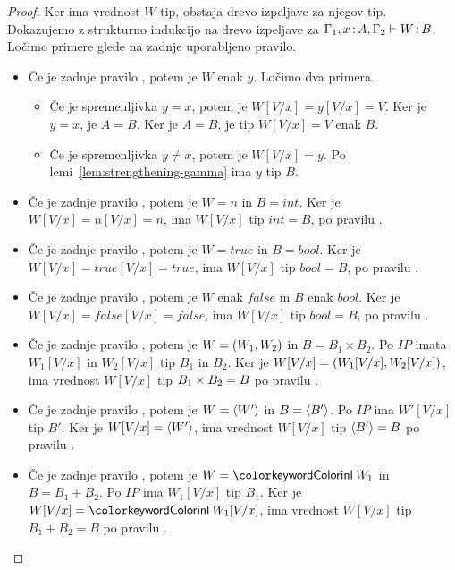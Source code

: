 \begin{proof}
	Ker ima vrednost $W$ tip, obstaja drevo izpeljave za njegov tip.
	Dokazujemo z strukturno indukcijo na drevo izpeljave za $\Gamma_1, x \mathinner{:} A, \Gamma_2 \vdash W \mathinner{:} B$.
	Ločimo primere glede na zadnje uporabljeno pravilo.
	
	\begin{itemize}
		\item Če je zadnje pravilo , potem je $W$ enak $y$. Ločimo dva primera.
		\begin{itemize}
			\item Če je spremenljivka $y = x$, potem je $W[V/x] = y[V/x] = V$. Ker je $y = x$, je $A = B$. Ker je $A = B$, je tip $W[V/x] = V$ enak $B$.
			\item Če je spremenljivka $y \neq x$, potem je $W[V/x] = y$. Po lemi~\ref{lem:strengthening-gamma} ima $y$ tip $B$.
		\end{itemize}
	
		\item Če je zadnje pravilo , potem je $W=n$ in $B=int$. Ker je $W[V/x] = n[V/x] = n$, ima $W[V/x]$ tip $int = B$, po pravilu .
		\item Če je zadnje pravilo , potem je $W=true$ in $B=bool$. Ker je $W[V/x] = true[V/x] = true$, ima $W[V/x]$ tip $bool = B$, po pravilu . 
		\item Če je zadnje pravilo , potem je $W$ enak $false$ in $B$ enak $bool$. Ker je $W[V/x] = false[V/x] = false$, ima $W[V/x]$ tip $bool = B$, po pravilu .
		
		\item Če je zadnje pravilo , potem je $W =( W_1 , W_2 )$ in $B = B_1 \times B_2$. Po $IP$ imata $W_1[V/x]$ in $W_2[V/x]$ tip $B_1$ in $B_2$.
		Ker je $W[V/x] = ( W_1[V/x] , W_2[V/x] )$, ima vrednost $W[V/x]$ tip $B_1 \times B_2 = B$ po pravilu .
		
		\item Če je zadnje pravilo , potem je $W = \langle W' \rangle$ in $B = \langle B' \rangle$. Po $IP$ ima $W'[V/x]$ tip $B'$.
		Ker je $W[V/x] = \langle W' \rangle$, ima vrednost $W[V/x]$ tip $\langle B' \rangle = B$ po pravilu .
		
		\item Če je zadnje pravilo , potem je $W = \tminl{W_1}$ in $B = B_1 + B_2$. Po $IP$ ima $W_1[V/x]$ tip $B_1$.
		Ker je $W[V/x] = \tminl{W_1[V/x]}$, ima vrednost $W[V/x]$ tip $B_1 + B_2 = B$ po pravilu .
		

\end{itemize}
\end{proof}
